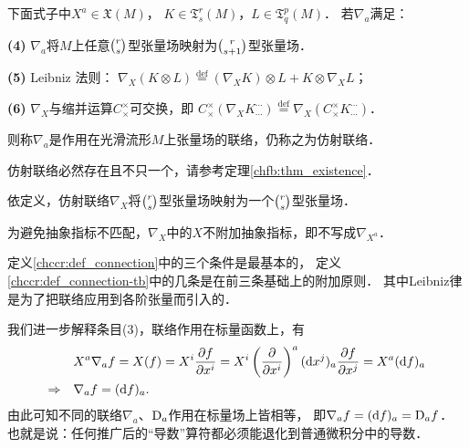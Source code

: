 \begin{definition}\label{chccr:def_connection-tb}
    下面式子中$ X^a\in \mathfrak{X}(M)$，
    $ K \in \mathfrak{T}^r_s(M) $，$ L \in \mathfrak{T}^p_q(M) $．
    若$\nabla_a$满足：
    
{\bfseries (4)} $\nabla_a$将$M$上任意$\binom{r}{s}$型张量场映射为$\binom{r}{s+1}$型张量场．

{\bfseries (5)} Leibniz 法则：
$\nabla_X(K\otimes L)\overset{\mathrm {def}}{=} (\nabla_X K)\otimes L+ K\otimes \nabla_X L$；

{\bfseries (6)} $\nabla_X$与缩并运算$C^\times_\times$可交换，即
$C^\times_\times(\nabla_X K_{\cdots}^{\cdots}) \overset{\mathrm {def}}{=} \nabla_X(C^\times_\times K_{\cdots}^{\cdots})$．
    
  
    则称$\nabla_a$是作用在光滑流形$M$上张量场的联络，仍称之为仿射联络．
\end{definition}


\begin{remark}\label{chccr:rek_ccl}
    仿射联络必然存在且不只一个，请参考定理\ref{chfb:thm_existence}．
\end{remark}
\begin{remark}
    依定义，仿射联络$\nabla_X$将$\binom{r}{s}$型张量场映射为一个$\binom{r}{s}$型张量场．
\end{remark}

\begin{remark}\label{chccr:rek_abstnoa}
    为避免抽象指标不匹配，$\nabla_X$中的$X$不附加抽象指标，即不写成$\nabla_{X^a}$．
\end{remark}

\begin{remark}
定义\ref{chccr:def_connection}中的三个条件是最基本的，
定义\ref{chccr:def_connection-tb}中的几条是在前三条基础上的附加原则．
其中Leibniz律是为了把联络应用到各阶张量而引入的．
\end{remark}

我们进一步解释条目(3)，联络作用在标量函数上，有
\begin{align}
    &X^a\nabla_a f = X(f) =
    X^i \frac{\partial f}{\partial x^i} =
    X^i \left(\frac{\partial }{\partial x^i}\right) ^a
    ({\rm d} x^j)_a \frac{\partial f}{\partial x^j} =
    X^a ({\rm d}f)_a  \notag \\
    {\Rightarrow} \quad &
    \nabla_a f = ({\rm d}f)_a . \label{chccr:eqn_Df=df}
\end{align}
由此可知不同的联络$\nabla_a$、${\rm D}_a$作用在标量场上皆相等，
即$\nabla_a f = ({\rm d}f)_a={\rm D}_a f$．
也就是说：任何推广后的“导数”算符都必须能退化到普通微积分中的导数．





